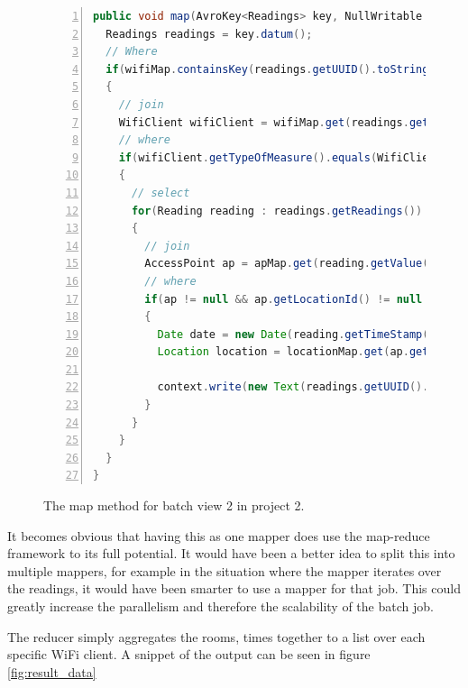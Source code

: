 \begin{figure}[H]
	
\begin{lstlisting}[frame=single, backgroundcolor=\color{light-gray}, basicstyle=\footnotesize\ttfamily, language=Java, numbers=left, numberstyle=\tiny \color{black}, breaklines=true]
public void map(AvroKey<Readings> key, NullWritable value, Context context) throws IOException, InterruptedException {
  Readings readings = key.datum();
  // Where
  if(wifiMap.containsKey(readings.getUUID().toString()))
  {
	// join
    WifiClient wifiClient = wifiMap.get(readings.getUUID().toString());
    // where
    if(wifiClient.getTypeOfMeasure().equals(WifiClientMeasure.AccessPoint))
    {
	  // select
      for(Reading reading : readings.getReadings())
      {
	    // join
        AccessPoint ap = apMap.get(reading.getValue());
        // where
        if(ap != null && ap.getLocationId() != null && locationMap.containsKey(ap.getLocationId()))
        {
          Date date = new Date(reading.getTimeStamp());
          Location location = locationMap.get(ap.getLocationId());
           
          context.write(new Text(readings.getUUID().toString()), new Text(location.getRoom() + "-" + dateFormat.format(date)));
        }
      }
    }
  }
}
\end{lstlisting}
\caption{The map method for batch view 2 in project 2.}
\label{code:project2_mapper}
\end{figure}

It becomes obvious that having this as one mapper does use the map-reduce framework to its full potential. It would have been a better idea to split this into multiple mappers, for example in the situation where the mapper iterates over the readings, it would have been smarter to use a mapper for that job. This could greatly increase the parallelism and therefore the scalability of the batch job.

The reducer simply aggregates the rooms, times together to a list over each specific WiFi client. A snippet of the output can be seen in figure \ref{fig:result_data}

